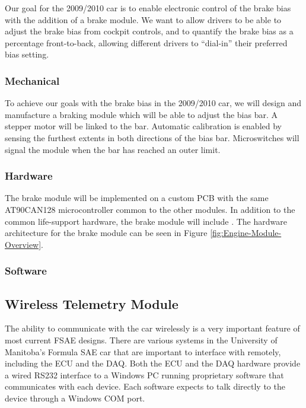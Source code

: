 Our goal for the 2009/2010 car is to enable electronic control of the brake bias with the addition of a brake module. We want to allow drivers to be able to adjust the brake bias from cockpit controls, and to quantify the brake bias as a percentage front-to-back, allowing different drivers to {}``dial-in'' their preferred bias setting.

\subsubsection{Mechanical}

To achieve our goals with the brake bias in the 2009/2010 car, we will design and manufacture a braking module which will be able to adjust the bias bar. A stepper motor will be linked to the bar. Automatic calibration is enabled by sensing the furthest extents in both directions of the bias bar. Microswitches will signal the module when the bar has reached an outer limit.

\subsubsection{Hardware}

The brake module will be implemented on a custom PCB with the same AT90CAN128 microcontroller common to the other modules. In addition to the common life-support hardware, the brake module will include . The hardware architecture for the brake module can be seen in Figure \ref{fig:Engine-Module-Overview}.

\subsubsection{Software}

%
%
\subsection{Wireless Telemetry Module}

The ability to communicate with the car wirelessly is a very important feature of most current FSAE designs. There are various systems in the University of Manitoba's Formula SAE car that are important to interface with remotely, including the ECU and the DAQ. Both the ECU and the DAQ hardware provide a wired RS232 interface to a Windows PC running proprietary software that communicates with each device. Each software expects to talk directly to the device through a Windows COM port.

